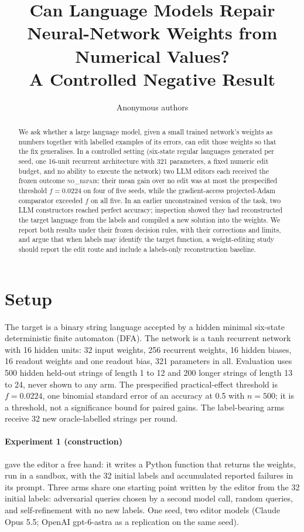 \documentclass{article}
\title{Can Language Models Repair Neural-Network Weights from Numerical Values?\\
A Controlled Negative Result}
\author{Anonymous authors}
\begin{document}
\maketitle

\begin{abstract}
We ask whether a large language model, given a small trained network's weights as numbers together with labelled examples of its errors, can edit those weights so that the fix generalises. In a controlled setting (six-state regular languages generated per seed, one 16-unit recurrent architecture with 321 parameters, a fixed numeric edit budget, and no ability to execute the network) two LLM editors each received the frozen outcome \textsc{no\_repair}: their mean gain over no edit was at most the prespecified threshold $f = 0.0224$ on four of five seeds, while the gradient-access projected-Adam comparator exceeded $f$ on all five. In an earlier unconstrained version of the task, two LLM constructors reached perfect accuracy; inspection showed they had reconstructed the target language from the labels and compiled a new solution into the weights. We report both results under their frozen decision rules, with their corrections and limits, and argue that when labels may identify the target function, a weight-editing study should report the edit route and include a labels-only reconstruction baseline.
\end{abstract}

\section{Setup}

The target is a binary string language accepted by a hidden minimal six-state deterministic finite automaton (DFA). The network is a tanh recurrent network with 16 hidden units: 32 input weights, 256 recurrent weights, 16 hidden biases, 16 readout weights and one readout bias, 321 parameters in all. Evaluation uses 500 hidden held-out strings of length 1 to 12 and 200 longer strings of length 13 to 24, never shown to any arm. The prespecified practical-effect threshold is $f = 0.0224$, one binomial standard error of an accuracy at 0.5 with $n = 500$; it is a threshold, not a significance bound for paired gains. The label-bearing arms receive 32 new oracle-labelled strings per round.

\paragraph{Experiment 1 (construction)} gave the editor a free hand: it writes a Python function that returns the weights, run in a sandbox, with the 32 initial labels and accumulated reported failures in its prompt. Three arms share one starting point written by the editor from the 32 initial labels: adversarial queries chosen by a second model call, random queries, and self-refinement with no new labels. One seed, two editor models (Claude Opus 5.5; OpenAI gpt-6-astra as a replication on the same seed).
\end{document}
